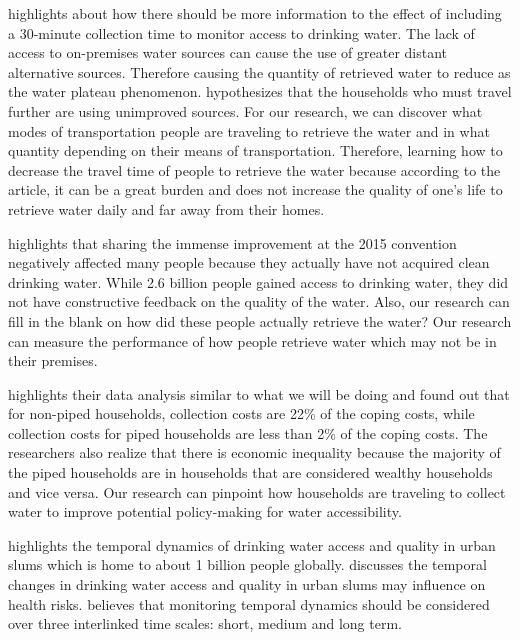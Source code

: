 \documentclass[10pt,twoside]{article}
\numberwithin{equation}{section}
\newcommand{\?}{\stackrel{?}{=}}
\begin{document}
\citet{cassivi2018access} highlights about how there should be more information to the effect of including a 30-minute
collection time to monitor access to drinking water. The lack of access to on-premises water sources can cause the use
of greater distant alternative sources. Therefore causing the quantity of retrieved water to reduce as the water plateau
phenomenon.\citet{cassivi2018access} hypothesizes that the households who must travel further are using unimproved
sources. For our research, we can discover what modes of transportation people are traveling to retrieve the water and
in what quantity depending on their means of transportation. Therefore, learning how to decrease the travel time of
people to retrieve the water because according to the article, it can be a great burden and does not increase the
quality of one's life to retrieve water daily and far away from their homes.

\citet{tortajada2018achieving} highlights that sharing the immense improvement at the 2015 convention negatively
affected many people because they actually have not acquired clean drinking water. While 2.6 billion people gained
access to drinking water, they did not have constructive feedback on the quality of the water. Also, our research can
fill in the blank on how did these people actually retrieve the water? Our research can measure the performance of how
people retrieve water which may not be in their premises.

\citet{amit2019measuring} highlights their data analysis similar to what we will be doing and found out that for
non-piped households, collection costs are 22\% of the coping costs, while collection costs for piped households are
less than 2\% of the coping costs. The researchers also realize that there is economic inequality because the majority
of the piped households are in households that are considered wealthy households and vice versa. Our research can
pinpoint how households are traveling to collect water to improve potential policy-making for water accessibility.

\citet{price2019difference} highlights the temporal dynamics of drinking water access and quality in urban slums which
is home to about 1 billion people globally. \citet{price2019difference} discusses the temporal changes in drinking water
access and quality in urban slums may influence on health risks. \citet{price2019difference} believes that monitoring
temporal dynamics should be considered over three interlinked time scales: short, medium and long term.
\end{document}
